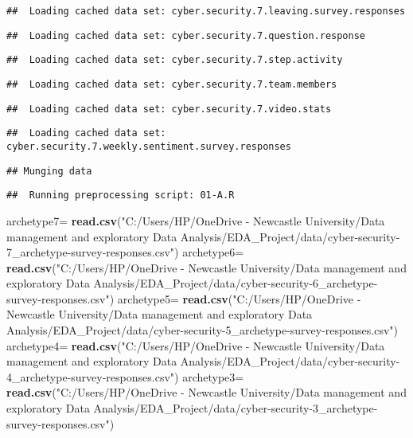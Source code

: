 \documentclass[]{article}
\newenvironment{Shaded}{\begin{snugshade}}{\end{snugshade}}
\newcommand{\KeywordTok}[1]{\textcolor[rgb]{0.13,0.29,0.53}{\textbf{#1}}}
\newcommand{\StringTok}[1]{\textcolor[rgb]{0.31,0.60,0.02}{#1}}
\newcommand{\NormalTok}[1]{#1}
\begin{document}
\begin{verbatim}
##  Loading cached data set: cyber.security.7.leaving.survey.responses
\end{verbatim}

\begin{verbatim}
##  Loading cached data set: cyber.security.7.question.response
\end{verbatim}

\begin{verbatim}
##  Loading cached data set: cyber.security.7.step.activity
\end{verbatim}

\begin{verbatim}
##  Loading cached data set: cyber.security.7.team.members
\end{verbatim}

\begin{verbatim}
##  Loading cached data set: cyber.security.7.video.stats
\end{verbatim}

\begin{verbatim}
##  Loading cached data set: cyber.security.7.weekly.sentiment.survey.responses
\end{verbatim}

\begin{verbatim}
## Munging data
\end{verbatim}

\begin{verbatim}
##  Running preprocessing script: 01-A.R
\end{verbatim}

\begin{Shaded}
\begin{Highlighting}[]
\NormalTok{archetype7=}\StringTok{ }\KeywordTok{read.csv}\NormalTok{(}\StringTok{"C:/Users/HP/OneDrive - Newcastle University/Data management and exploratory Data Analysis/EDA_Project/data/cyber-security-7_archetype-survey-responses.csv"}\NormalTok{)}
\NormalTok{archetype6=}\StringTok{ }\KeywordTok{read.csv}\NormalTok{(}\StringTok{"C:/Users/HP/OneDrive - Newcastle University/Data management and exploratory Data Analysis/EDA_Project/data/cyber-security-6_archetype-survey-responses.csv"}\NormalTok{)}
\NormalTok{archetype5=}\StringTok{ }\KeywordTok{read.csv}\NormalTok{(}\StringTok{"C:/Users/HP/OneDrive - Newcastle University/Data management and exploratory Data Analysis/EDA_Project/data/cyber-security-5_archetype-survey-responses.csv"}\NormalTok{)}
\NormalTok{archetype4=}\StringTok{ }\KeywordTok{read.csv}\NormalTok{(}\StringTok{"C:/Users/HP/OneDrive - Newcastle University/Data management and exploratory Data Analysis/EDA_Project/data/cyber-security-4_archetype-survey-responses.csv"}\NormalTok{)}
\NormalTok{archetype3=}\StringTok{ }\KeywordTok{read.csv}\NormalTok{(}\StringTok{"C:/Users/HP/OneDrive - Newcastle University/Data management and exploratory Data Analysis/EDA_Project/data/cyber-security-3_archetype-survey-responses.csv"}\NormalTok{)}
\end{Highlighting}
\end{Shaded}
\end{document}
